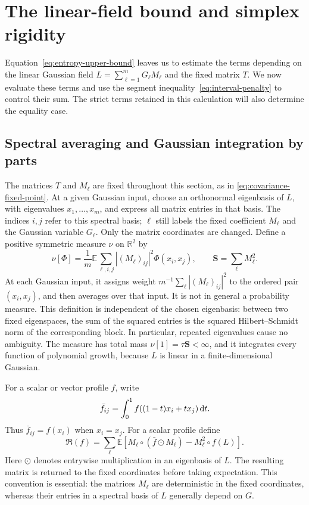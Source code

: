 \section{The linear-field bound and simplex rigidity}\label{sec:06-linear-equality}

Equation~\eqref{eq:entropy-upper-bound} leaves us to estimate the terms depending on the linear Gaussian field $L=\sum_{\ell=1}^m G_\ell M_\ell$ and the fixed matrix $T$. We now evaluate these terms and use the segment inequality~\eqref{eq:interval-penalty} to control their sum.  The strict terms retained in this calculation will also determine the equality case.

\subsection{Spectral averaging and Gaussian integration by parts}

The matrices $T$ and $M_\ell$ are fixed throughout this section, as in \eqref{eq:covariance-fixed-point}.  At a given Gaussian input, choose an orthonormal eigenbasis of $L$, with eigenvalues $x_1,\ldots,x_m$, and express all matrix entries in that basis.  The indices $i,j$ refer to this spectral basis; $\ell$ still labels the fixed coefficient $M_\ell$ and the Gaussian variable $G_\ell$. Only the matrix coordinates are changed. Define a positive symmetric measure $\nu$ on $\mathbb{R}^2$ by
\[
 \nu[\Phi]=\frac1m\mathbb{E}\sum_{\ell,i,j}
       |(M_\ell)_{ij}|^2\Phi(x_i,x_j),
 \qquad \mathbf{S}=\sum_\ell M_\ell^2.
\]
At each Gaussian input, it assigns weight $m^{-1}\sum_\ell|(M_\ell)_{ij}|^2$ to the ordered pair $(x_i,x_j)$, and then averages over that input. It is not in general a probability measure. This definition is independent of the chosen eigenbasis: between two fixed eigenspaces, the sum of the squared entries is the squared Hilbert--Schmidt norm of the corresponding block.  In particular, repeated eigenvalues cause no ambiguity.  The measure has total mass $\nu[1]=\tau\mathbf{S}<\infty$, and it integrates every function of polynomial growth, because $L$ is linear in a finite-dimensional Gaussian.

For a scalar or vector profile $f$, write
\[
 \bar f_{ij}=\int_0^1 f((1-t)x_i+tx_j)\,\mathrm{d} t.
\]
Thus $\bar f_{ij}=f(x_i)$ when $x_i=x_j$.  For a scalar profile define
\[
 \mathfrak{R}(f)=\sum_\ell\mathbb{E}\left[
       M_\ell\circ(\bar f\odot M_\ell)-M_\ell^2\circ f(L)\right].
\]
Here $\odot$ denotes entrywise multiplication in an eigenbasis of $L$. The resulting matrix is returned to the fixed coordinates before taking expectation.  This convention is essential: the matrices $M_\ell$ are deterministic in the fixed coordinates, whereas their entries in a spectral basis of $L$ generally depend on $G$.

